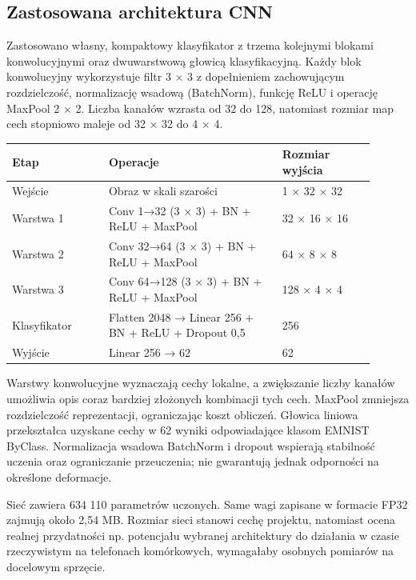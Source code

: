 \subsection{Zastosowana architektura
  CNN}\label{zastosowana-architektura-cnn}

Zastosowano własny, kompaktowy klasyfikator z trzema kolejnymi blokami
konwolucyjnymi oraz dwuwarstwową głowicą klasyfikacyjną. Każdy blok
konwolucyjny wykorzystuje filtr 3 × 3 z dopełnieniem zachowującym
rozdzielczość, normalizację wsadową (BatchNorm), funkcję ReLU i operację
MaxPool 2 × 2. Liczba kanałów wzrasta od 32 do 128, natomiast rozmiar
map cech stopniowo maleje od 32 × 32 do 4 × 4.

\begin{longtable}{p{0.24\linewidth}p{0.43\linewidth}p{0.23\linewidth}}
  \toprule
  \textbf{Etap} & \textbf{Operacje}                                   & \textbf{Rozmiar wyjścia} \\
  \midrule
  Wejście       & Obraz w skali szarości                              & 1 × 32 × 32              \\
  Warstwa 1     & Conv 1→32 (3 × 3) + BN + ReLU + MaxPool             & 32 × 16 × 16             \\
  Warstwa 2     & Conv 32→64 (3 × 3) + BN + ReLU + MaxPool            & 64 × 8 × 8               \\
  Warstwa 3     & Conv 64→128 (3 × 3) + BN + ReLU + MaxPool           & 128 × 4 × 4              \\
  Klasyfikator  & Flatten 2048 → Linear 256 + BN + ReLU + Dropout 0,5 & 256                      \\
  Wyjście       & Linear 256 → 62                                     & 62                       \\
  \bottomrule
\end{longtable}

Warstwy konwolucyjne wyznaczają cechy lokalne, a zwiększanie liczby
kanałów umożliwia opis coraz bardziej złożonych kombinacji tych cech.
MaxPool zmniejsza rozdzielczość reprezentacji, ograniczając koszt
obliczeń. Głowica liniowa przekształca uzyskane cechy w 62 wyniki
odpowiadające klasom EMNIST ByClass. Normalizacja wsadowa BatchNorm i
dropout wspierają stabilność uczenia oraz ograniczanie przeuczenia; nie
gwarantują jednak odporności na określone deformacje.

Sieć zawiera 634 110 parametrów uczonych. Same wagi zapisane w formacie
FP32 zajmują około 2,54 MB. Rozmiar sieci stanowi cechę projektu,
natomiast ocena realnej przydatności np. potencjału wybranej
architektury do działania w czasie rzeczywistym na telefonach
komórkowych, wymagałaby osobnych pomiarów na docelowym sprzęcie.

